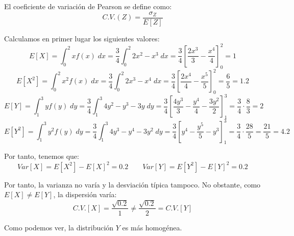 \begin{ejercicio}
\begin{enumerate}
        El coeficiente de variación de Pearson se define como:
        \begin{equation*}
            C.V.(Z) = \frac{\sigma_Z}{E[Z]}
        \end{equation*}

        Calculamos en primer lugar los siguientes valores:
        \begin{equation*}
            E[X] = \int_0^2 xf(x)\;dx = \frac{3}{4}\int_0^2 2x^2-x^3\;dx = \frac{3}{4}\left[\frac{2x^3}{3}-\frac{x^4}{4}\right]_0^2 = 1
        \end{equation*}
        \begin{equation*}
            E[X^2] = \int_0^2 x^2f(x)\;dx = \frac{3}{4}\int_0^2 2x^3-x^4\;dx = \frac{3}{4}\left[\frac{2x^4}{4}-\frac{x^5}{5}\right]_0^2 = \frac{6}{5} = 1.2
        \end{equation*}
        \begin{equation*}
            E[Y] = \int_1^3 yf(y)\;dy = \frac{3}{4}\int_1^3 4y^2-y^3-3y\;dy = \frac{3}{4}\left[\frac{4y^3}{3} - \frac{y^4}{4} - \frac{3y^2}{2}\right]_1^3 = \frac{3}{4}\cdot \frac{8}{3} = 2
        \end{equation*}
        \begin{equation*}
            E[Y^2] = \int_1^3 y^2f(y)\;dy = \frac{3}{4}\int_1^3 4y^3-y^4-3y^2\;dy = \frac{3}{4}\left[y^4 - \frac{y^5}{5} - y^3\right]_1^3 = \frac{3}{4}\cdot \frac{28}{5} = \frac{21}{5} = 4.2
        \end{equation*}

        Por tanto, tenemos que:
        \begin{equation*}
            Var[X] = E[X^2] -E[X]^2 = 0.2
            \qquad
            Var[Y] = E[Y^2] -E[Y]^2 = 0.2
        \end{equation*}

        Por tanto, la varianza no varía y la desviación típica tampoco. No obstante, como $E[X]\neq E[Y]$, la dispersión varía:
        \begin{equation*}
            C.V.[X] = \frac{\sqrt{0.2}}{1} \neq \frac{\sqrt{0.2}}{2} = C.V.[Y]
        \end{equation*}

        Como podemos ver, la distribución $Y$ es más homogénea.
    \end{enumerate}
\end{ejercicio}


